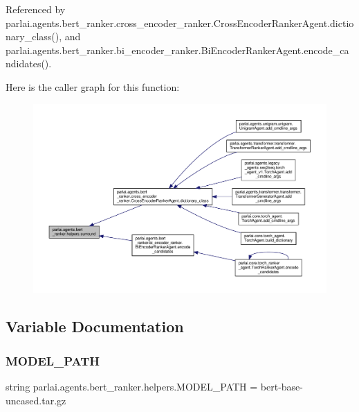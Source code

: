 Referenced by parlai.\+agents.\+bert\+\_\+ranker.\+cross\+\_\+encoder\+\_\+ranker.\+Cross\+Encoder\+Ranker\+Agent.\+dictionary\+\_\+class(), and parlai.\+agents.\+bert\+\_\+ranker.\+bi\+\_\+encoder\+\_\+ranker.\+Bi\+Encoder\+Ranker\+Agent.\+encode\+\_\+candidates().

Here is the caller graph for this function\+:
\nopagebreak
\begin{figure}[H]
\begin{center}
\leavevmode
\includegraphics[width=350pt]{namespaceparlai_1_1agents_1_1bert__ranker_1_1helpers_ae5621255d8851c9628c116cb6db4c28c_icgraph}
\end{center}
\end{figure}


\subsection{Variable Documentation}
\mbox{\label{namespaceparlai_1_1agents_1_1bert__ranker_1_1helpers_a596044b27f3659ebe25c250dca2f15f7}} 
\subsubsection{\texorpdfstring{M\+O\+D\+E\+L\+\_\+\+P\+A\+TH}{MODEL\_PATH}}
{\footnotesize\ttfamily string parlai.\+agents.\+bert\+\_\+ranker.\+helpers.\+M\+O\+D\+E\+L\+\_\+\+P\+A\+TH = \textquotesingle{}bert-\/base-\/uncased.\+tar.\+gz\textquotesingle{}}



